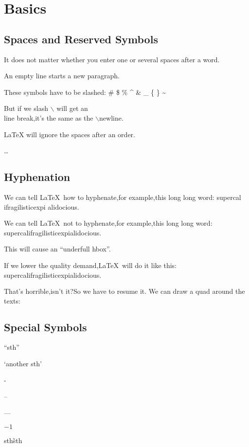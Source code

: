 \chapter{Basics}

\section{Spaces and Reserved Symbols}


It does not matter whether you enter one or several spaces after a
word.

An empty line starts a new paragraph.

These symbols have to be slashed: \# \$ \% \^{} \& \_ \{ \} \~{}

But if we slash $\backslash$ will get an \\ line break,it's the same
as the
\newline $\backslash$newline.

\LaTeX{} will ignore the spaces after an order.

\ldots
\section{Hyphenation}

We can tell \LaTeX\ how to hyphenate,for example,this long long word: su\-per\-cal\-%
i\-frag\-i\-lis\-tic\-ex\-pi\-%
al\-i\-do\-cious.

We can tell \LaTeX\ not to hyphenate,for example,this long long
word: \mbox{supercalifragilisticexpialidocious}.

This will cause an ``underfull hbox''.

If we lower the quality demand,\LaTeX\ will do it like this:\sloppy
\mbox{supercalifragilisticexpialidocious}.

That's horrible,isn't it?So we have to resume it.\fussy
We can draw a quad around the
texts:

\section{Special Symbols}

``sth''

`another sth'

-

--

---

$-1$

sth\~ sth

